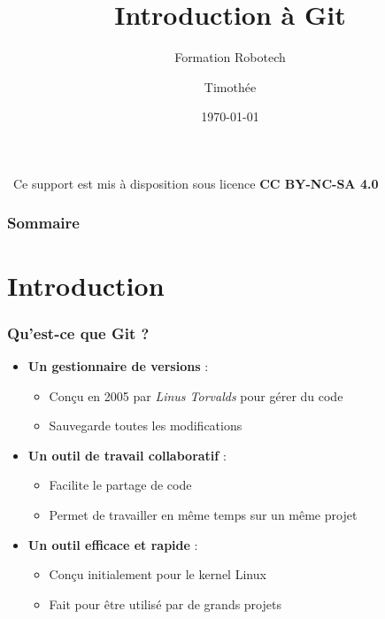 \documentclass[
	11pt,
	aspectratio=169
]{beamer}
\title[Introduction à Git]{Introduction à Git}
\subtitle{Formation Robotech}
\author[Timothée pour Robotech]{Timothée}
\institute[Robotech]{\url{https://github.com/Robotech-Lillois}}
\date[\today \quad \ccbyncsa]{\today}
\begin{document}
\begin{frame}
    \titlepage
    \vspace{-0.6cm}
    \begin{center}
        \footnotesize
        \ccbyncsa\ Ce support est mis à disposition sous licence \textbf{CC BY-NC-SA 4.0}
    \end{center}
\end{frame}

\begin{frame}
    \frametitle{Sommaire}
    \tableofcontents
\end{frame}

\section{Introduction}

\begin{frame}
    \frametitle{Qu'est-ce que Git ?}
    \begin{itemize}
        \item \textbf{Un gestionnaire de versions} :
        \begin{itemize}
            \item Conçu en 2005 par \textit{Linus Torvalds} pour gérer du code
            \item Sauvegarde toutes les modifications
        \end{itemize}
        \bigskip
        \item \textbf{Un outil de travail collaboratif} :
        \begin{itemize}
            \item Facilite le partage de code
            \item Permet de travailler en même temps sur un même projet
        \end{itemize}
        \bigskip
        \item \textbf{Un outil efficace et rapide} :
        \begin{itemize}
            \item Conçu initialement pour le kernel Linux
            \item Fait pour être utilisé par de grands projets
        \end{itemize}
    \end{itemize}
\end{frame}
\end{document}
